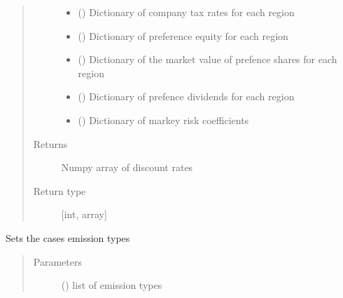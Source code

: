 \documentclass[a4paper,12pt,english]{article}
\begin{document}
\begin{fulllineitems}
\begin{fulllineitems}
\begin{quote}
\begin{description}
\begin{itemize}
\item {} 
 () \textendash{} Dictionary of company tax rates for each region

\item {} 
 () \textendash{} Dictionary of preference equity for each region

\item {} 
 () \textendash{} Dictionary of the market value of prefence shares for each region

\item {} 
 () \textendash{} Dictionary of prefence dividends for each region

\item {} 
 () \textendash{} Dictionary of markey risk co\sphinxhyphen{}efficients

\end{itemize}

\item[{Returns}] \leavevmode
Numpy array of discount rates

\item[{Return type}] \leavevmode
{[}int, array{]}

\end{description}\end{quote}

\end{fulllineitems}


\begin{fulllineitems}
\label{\detokenize{GOCPI:GOCPI.CreateCases.CreateCases.set_emission}}
Sets the cases emission types
\begin{quote}\begin{description}
\item[{Parameters}] \leavevmode
{} () \textendash{} list of emission types


\end{description}
\end{quote}
\end{fulllineitems}
\end{fulllineitems}
\end{document}
